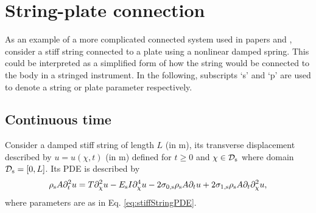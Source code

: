 
\section{String-plate connection}\label{sec:stringPlateConnection}
As an example of a more complicated connected system used in papers \citeP[A] and \citeP[B], consider a stiff string connected to a plate using a nonlinear damped spring. This could be interpreted as a simplified form of how the string would be connected to the body in a stringed instrument. In the following, subscripts `s' and `p' are used to denote a string or plate parameter respectively. 

\subsection{Continuous time}
Consider a damped stiff string of length $L$ (in m), its transverse displacement described by $u = u(\chi,t)$ (in m) defined for $t\geq 0$ and $\chi \in \mathcal{D}_{\text{s}}$ where domain $\mathcal{D}_{\text{s}} = [0, L]$. Its PDE is described by
\begin{equation}
    \rho_\stxt A\ptt u = T \partial_{\chi}^2 u - E_\stxt I \partial_{\chi}^4 u - 2\szX[\stxt]\rho_\stxt A\pt u + 2\soX[\stxt]\rho_\stxt A\pt\partial_{\chi}^2 u,
\end{equation}
where parameters are as in Eq. \eqref{eq:stiffStringPDE}.

